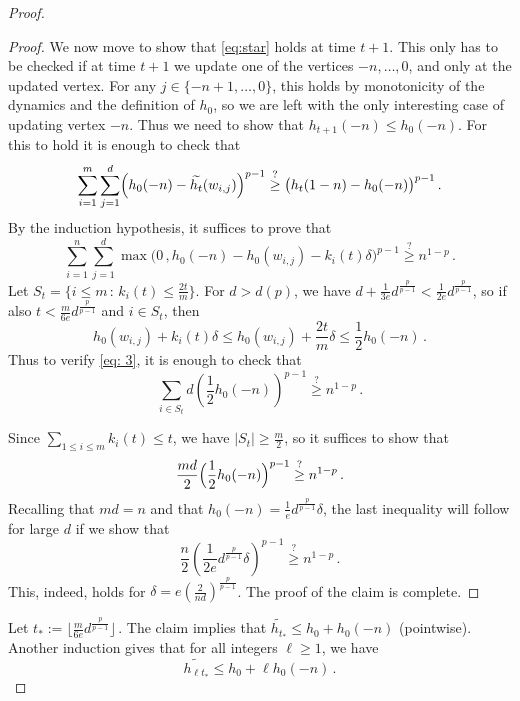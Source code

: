 \documentclass[10pt,a4paper]{amsart}
\begin{document}
\begin{proof}
\begin{proof}
    We now move to show that \eqref{eq:star} holds at time $t+1$. This only has to be checked if at time $t+1$ we update one of the vertices $-n,\ldots, 0$, and only at the updated vertex. For any $j\in \{-n+1,\dots,0\}$, this holds by monotonicity of the dynamics and the definition of $h_0$, so we are left with the only interesting case of updating vertex $-n$. Thus we need to show that $h_{t+1}(-n)\leq h_0(-n)$. For this to hold it is enough to check that 
   \begin{equation} 
       \sum_{i=1}^m \sum_{j=1}^d \Bigl(h_0(-n)  - \widetilde{h_t}(w_{i,j})\Bigr)^{p-1} 
 \stackrel{?}{\geq} \big(h_t(1-n)-h_0(-n)\big)^{p-1} \,.
   \end{equation}
    By the induction hypothesis,  it suffices to prove that 
\begin{equation}\label{eq: 3}
        \sum_{i=1}^n \sum_{j=1}^d \max \bigl(0 \,,   h_0(-n)-h_0(w_{i,j})-k_i(t) \delta \bigr)^{p-1}\stackrel{?}{\geq} n^{1-p} \,.
    \end{equation}
    Let $S_t= \{i\leq m \, : \, k_i(t)\leq \frac{2t}{m} \}$.
    For  $d>d(p)$,  we have
    $d+\frac{1}{3e}d^{\frac{p}{p-1}} <\frac{1}{2e} d^{\frac{p}{p-1}}$, so if also $t< \frac{m}{6e}d^{\frac{p}{p-1}}$ and $i \in S_t$, then  
    $$ h_0(w_{i,j})+k_i(t) \delta \le h_0(w_{i,j})+\frac{2t}{m} \delta \le \frac{1}{2} h_0(-n) \,.$$
     Thus to verify \eqref{eq: 3}, it is enough to check   that
    \begin{equation}
        \sum_{i\in S_t} d\left( \frac{1}{2} h_0(-n)\right)^{p-1}\stackrel{?}{\geq} n^{1-p} \, .
    \end{equation}
    
     Since $\sum_{1\leq i\leq m}k_i(t)\leq t$, we have $|S_t|\geq \frac{m}{2}$, so it suffices to show that
    \begin{equation}
        \frac{md}{2} \Bigl(\frac12 h_0(-n) \Bigr)^{p-1}\stackrel{?}{\geq} n^{1-p} \,. 
    \end{equation}
    Recalling that $md=n$ and that $h_0(-n)=\frac{1}{e} d^\frac{p}{p-1}\delta$, the last inequality will follow for large $d$ if we show that
    \begin{equation}
        \frac{n}{2}\left(\frac{1}{2e}d^\frac{p}{p-1}\delta\right)^{p-1}\stackrel{?}{\geq} n^{1-p} \, .
    \end{equation}
    This, indeed, holds for  
    $\delta =   e\left(\frac{2}{nd}\right)^{\frac{p}{p-1}}$.   The proof of the claim is complete. \end{proof}
Let $t_*:= \Big\lfloor\frac{m}{6e}d^{\frac{p}{p-1}} \Big\rfloor \,.$
The claim implies that $\widetilde{h_{t_*}} \leq h_0 + h_0(-n)$ (pointwise). Another induction gives that for all integers $\ell \ge 1$, we have
\[ \widetilde{h_{\ell t_*}}\leq h_0+\ell h_0(-n) \,.\]  


\end{proof}
\end{document}
